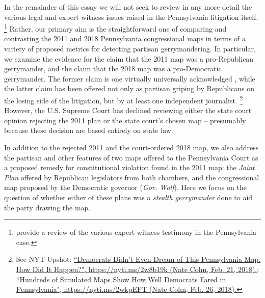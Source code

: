 \par
    In the remainder of this essay we will not seek to review in any more detail the various legal and expert witness issues raised in the Pennsylvania litigation itself.
        \footnote{\citet{Grofman_Cervas_2018_ELJ} provide a review of the various expert witness testimony in the Pennsylvania case.}
    Rather, our primary aim is the straightforward one of comparing and contrasting the 2011 and 2018 Pennsylvania congressional maps in terms of a variety of proposed metrics for detecting partisan gerrymandering. In particular, we examine the evidence for the claim that the 2011 map was a pro-Republican gerrymander, and the claim that the 2018 map was a pro-Democratic gerrymander. The former claim is one virtually universally acknowledged \citep{Fang2014, Mcgann_et_al_2015_ELJ, McGann_et_al_2016_gerrymandering, Wang2016_SLR, Wang2016_ELJ}, while the latter claim has been offered not only as partisan griping by Republicans on the losing side of the litigation, but by at least one independent journalist.
        \footnote{See NYT Upshot: \href{https://nyti.ms/2w8b19k}{``Democrats Didn’t Even Dream of This Pennsylvania Map. How Did It Happen?", https://nyti.ms/2w8b19k (Nate Cohn, Feb. 21, 2018).;} \\
        \href{https://nyti.ms/2wkpEFT}{``Hundreds of Simulated Maps Show How Well Democrats Fared in Pennsylvania", https://nyti.ms/2wkpEFT (Nate Cohn, Feb. 26, 2018).}}
    However, the U.S. Supreme Court has declined reviewing either the state court opinion rejecting the 2011 plan or the state court’s chosen map -- presumably because these decision are based entirely on state law.
\par
    In addition to the rejected 2011 and the court-ordered 2018 map, we also address the partisan and other features of two maps offered to the Pennsylvania Court as a proposed remedy for constitutional violation found in the 2011 map: the \textit{Joint Plan} offered by Republican legislators from both chambers, and the congressional map proposed by the Democratic governor (\textit{Gov. Wolf}). Here we focus on the question of whether either of these plans was a \textit{stealth gerrymander} done to aid the party drawing the map.
\par
